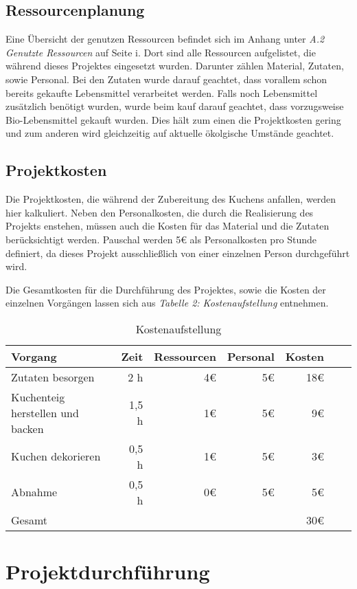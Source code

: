 \subsection{Ressourcenplanung}
Eine Übersicht der genutzen Ressourcen befindet sich im Anhang unter \emph{A.2 Genutzte Ressourcen} auf Seite i. Dort
sind alle Ressourcen aufgelistet, die während dieses Projektes eingesetzt wurden. Darunter
zählen Material, Zutaten, sowie Personal. Bei den Zutaten wurde darauf geachtet, dass vorallem schon bereits gekaufte Lebensmittel verarbeitet werden.
Falls noch Lebensmittel zusätzlich benötigt wurden, wurde beim kauf darauf geachtet, dass vorzugsweise Bio-Lebensmittel gekauft wurden.
Dies hält zum einen die Projektkosten gering und zum anderen wird gleichzeitig auf aktuelle ökolgische Umstände geachtet.
\subsection{Projektkosten}
Die Projektkosten, die während der Zubereitung des Kuchens anfallen, werden hier kalkuliert.
Neben den Personalkosten, die durch die Realisierung des Projekts enstehen, müssen auch die Kosten für das Material und die Zutaten berücksichtigt werden.
Pauschal werden 5€ als Personalkosten pro Stunde definiert, da dieses Projekt ausschließlich von einer einzelnen Person durchgeführt wird.

Die Gesamtkosten für die Durchführung des Projektes, sowie die Kosten der einzelnen Vorgängen lassen sich aus \emph{Tabelle 2: Kostenaufstellung} entnehmen.

\begin{table}[h]
    \centering
    \begin{tabular}{l*{5}{r}r|}
        \hline
        Vorgang    & Zeit  &    Ressourcen & Personal & Kosten\\
        \hline
        Zutaten besorgen & 2 h & 4€ & 5€ & 18€\\
        Kuchenteig herstellen und backen    & 1,5 h & 1€ & 5€  & 9€ \\
        Kuchen dekorieren      & 0,5 h & 1€ & 5€ & 3€   \\
        Abnahme & 0,5 h & 0€ & 5€ & 5€ \\
        \hline
        Gesamt & & & & 30€ \\
        \hline
        \end{tabular}
        \caption{Kostenaufstellung}
\end{table}
\section{Projektdurchführung}

